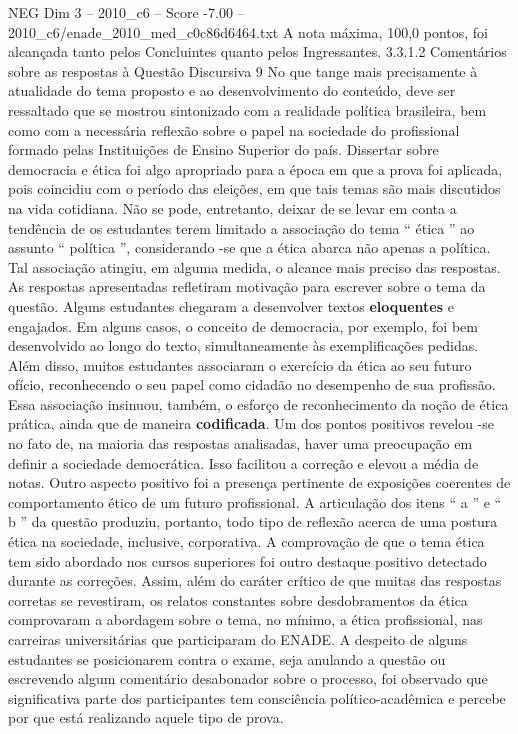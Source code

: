 \begin{textsample}{NEG Dim 3 – 2010\_c6 – Score -7.00 – 2010\_c6/enade\_2010\_med\_c0c86d6464.txt}
A nota máxima, 100,0 pontos, foi alcançada tanto pelos Concluintes quanto pelos Ingressantes. 3.3.1.2 Comentários sobre as respostas à Questão Discursiva 9 No que tange mais precisamente à atualidade do tema proposto e ao desenvolvimento do conteúdo, deve ser ressaltado que se mostrou sintonizado com a realidade política brasileira, bem como com a necessária reflexão sobre o papel na sociedade do profissional formado pelas Instituições de Ensino Superior do país.
Dissertar sobre democracia e ética foi algo apropriado para a época em que a prova foi aplicada, pois coincidiu com o período das eleições, em que tais temas são mais discutidos na vida cotidiana.
Não se pode, entretanto, deixar de se levar em conta a tendência de os estudantes terem limitado a associação do tema “ ética ” ao assunto “ política ”, considerando -se que a ética abarca não apenas a política.
Tal associação atingiu, em alguma medida, o alcance mais preciso das respostas.
As respostas apresentadas refletiram motivação para escrever sobre o tema da questão.
Alguns estudantes chegaram a desenvolver textos \textbf{eloquentes} e engajados.
Em alguns casos, o conceito de democracia, por exemplo, foi bem desenvolvido ao longo do texto, simultaneamente às exemplificações pedidas.
Além disso, muitos estudantes associaram o exercício da ética ao seu futuro ofício, reconhecendo o seu papel como cidadão no desempenho de sua profissão.
Essa associação insinuou, também, o esforço de reconhecimento da noção de ética prática, ainda que de maneira \textbf{codificada}.
Um dos pontos positivos revelou -se no fato de, na maioria das respostas analisadas, haver uma preocupação em definir a sociedade democrática.
Isso facilitou a correção e elevou a média de notas.
Outro aspecto positivo foi a presença pertinente de exposições coerentes de comportamento ético de um futuro profissional.
A articulação dos itens “ a ” e “ b ” da questão produziu, portanto, todo tipo de reflexão acerca de uma postura ética na sociedade, inclusive, corporativa.
A comprovação de que o tema ética tem sido abordado nos cursos superiores foi outro destaque positivo detectado durante as correções.
Assim, além do caráter crítico de que muitas das respostas corretas se revestiram, os relatos constantes sobre desdobramentos da ética comprovaram a abordagem sobre o tema, no mínimo, a ética profissional, nas carreiras universitárias que participaram do ENADE.
A despeito de alguns estudantes se posicionarem contra o exame, seja anulando a questão ou escrevendo algum comentário desabonador sobre o processo, foi observado que significativa parte dos participantes tem consciência político-acadêmica e percebe por que está realizando aquele tipo de prova.

\end{textsample}
